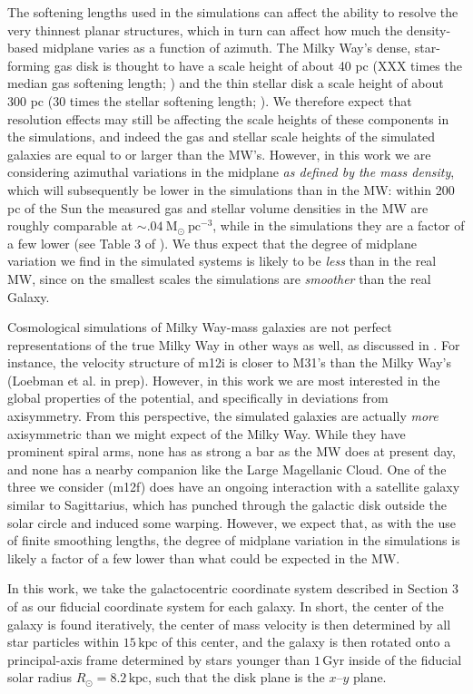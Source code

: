 \documentclass[twocolumn]{aastex62}
\newcommand{\Msun}{\ensuremath{\text{M}_\odot}}
\newcommand{\kpc}{\text{kpc}}
\newcommand{\Gyr}{\text{Gyr}}
\newcommand{\unit}[2]{\ensuremath{\textrm{#1}^{\mathrm{#2}}}}
\newcommand{\mf}{\textsf{m12f}}
\begin{document}
The softening lengths used in the simulations can affect the ability to
resolve the very thinnest planar structures, which in turn can affect how much
the density-based midplane varies as a function of azimuth. The Milky Way's
dense, star-forming gas disk is thought to have a scale height of about 40 pc (XXX times the
median gas softening length; \citealt{2019ApJ...871..145A}) and the thin stellar disk a scale height of about 300 pc (30 times the stellar softening length; \citealt{2008ApJ...673..864J}). We therefore expect that
resolution effects may still be affecting the scale heights of these
components in the simulations, and indeed the gas and stellar scale heights of
the simulated galaxies are equal to or larger than the MW's. However, in this
work we are considering azimuthal variations in the midplane \emph{as defined
by the mass density}, which will subsequently be lower in the simulations than
in the MW: within 200 pc of the Sun the measured gas and stellar volume
densities in the MW are roughly comparable at $\sim .04\ \Msun\
\unit{pc}{-3}$, while in the simulations they are a factor of a few lower (see
Table 3 of \citealt{2018arXiv180610564S}). We thus expect that the degree of
midplane variation we find in the simulated systems is likely to be
\emph{less} than in the real MW, since on the smallest scales the simulations
are \emph{smoother} than the real Galaxy.


Cosmological simulations of Milky Way-mass galaxies are not perfect
representations of the true Milky Way in other ways as well, as discussed in
\citet{2018arXiv180610564S}. For instance, the velocity structure of m12i is
closer to M31's than the Milky Way's (Loebman et al. in prep). However, in
this work we are most interested in the global properties of the potential,
and specifically in deviations from axisymmetry. From this perspective, the
simulated galaxies are actually \emph{more} axisymmetric than we might expect
of the Milky Way. While they have prominent spiral arms, none has as strong a
bar as the MW does at present day, and none has a nearby companion like the
Large Magellanic Cloud. One of the three we consider (\mf) does have an
ongoing interaction with a satellite galaxy similar to Sagittarius, which has
punched through the galactic disk outside the solar circle and induced some
warping. However, we expect that, as with the use of finite smoothing lengths,
the degree of midplane variation in the simulations is likely a factor of a
few lower than what could be expected in the MW.

In this work, we take the galactocentric coordinate system described in
Section 3 of \citet{2018arXiv180610564S} as our fiducial coordinate system for
each galaxy. In short, the center of the galaxy is found iteratively, the
center of mass velocity is then determined by all star particles within
$15\,\kpc$ of this center, and the galaxy is then rotated onto a
principal-axis frame determined by stars younger than $1\,\Gyr$ inside of the
fiducial solar radius $R_{\odot} = 8.2\,\kpc$, such that the disk plane is the
$x$--$y$ plane.
\end{document}

